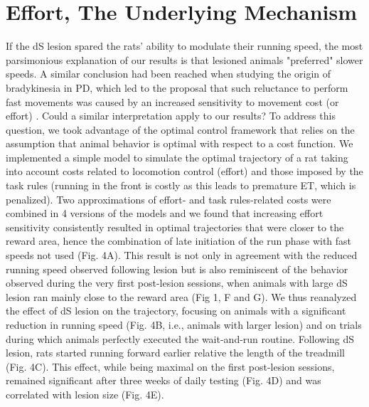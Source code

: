 \section{Effort, The Underlying Mechanism}
\label{ch:lesion:effort}

If the dS lesion spared the rats' ability to modulate their running speed, the most parsimonious explanation of our results is that lesioned animals "preferred" slower speeds.
A similar conclusion had been reached when studying the origin of bradykinesia in PD, which led to the proposal that such reluctance to perform fast movements was caused by an increased sensitivity to movement cost (or effort) \cite{Mazzoni2007JN, Baraduc2013JN}.
Could a similar interpretation apply to our results?
To address this question, we took advantage of the optimal control framework that relies on the assumption that animal behavior is optimal with respect to a cost function.
We implemented a simple model to simulate the optimal trajectory of a rat taking into account costs related to locomotion control (effort) and those imposed by the task rules (running in the front is costly as this leads to premature ET, which is penalized).
Two approximations of effort- and task rules-related costs were combined in 4 versions of the models and we found that increasing effort sensitivity consistently resulted in optimal trajectories that were closer to the reward area, hence the combination of late initiation of the run phase with fast speeds not used (Fig. 4A).
This result is not only in agreement with the reduced running speed observed following lesion but is also reminiscent of the behavior observed during the very first post-lesion sessions, when animals with large dS lesion ran mainly close to the reward area (Fig 1, F and G). 
We thus reanalyzed the effect of dS lesion on the trajectory, focusing on animals with a significant reduction in running speed (Fig. 4B, i.e., animals with larger lesion) and on trials during which animals perfectly executed the wait-and-run routine.
Following dS lesion, rats started running forward earlier relative the length of the treadmill (Fig. 4C).
This effect, while being maximal on the first post-lesion sessions, remained significant after three weeks of daily testing (Fig. 4D) and was correlated with lesion size (Fig. 4E).







